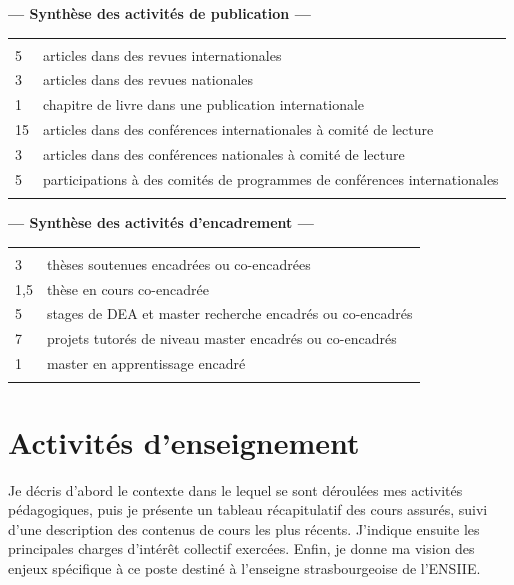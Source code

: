 \documentclass[11pt]{article}
\begin{document}
\begin{center}
	\textbf{--- Synthèse des activités de publication ---}\\[1mm]
\begin{tabular}{ll}
	\hline\\[-2mm]
	5	&	articles dans des revues internationales\\
	3	&	articles dans des revues nationales\\
	1	&	chapitre de livre dans une publication internationale\\
	15	& 	articles dans des conférences internationales à comité de lecture\\
	3	&	articles dans des conférences nationales à comité de lecture\\
	5	& 	participations à des comités de programmes de conférences internationales\\
	\hline\\
\end{tabular}


	\textbf{--- Synthèse des activités d'encadrement ---}\\[1mm]
\begin{tabular}{ll}
	\hline\\[-2mm]
	3	&	thèses soutenues encadrées ou co-encadrées\\
	1,5	& 	thèse en cours co-encadrée\\
	5	&	stages de DEA et master recherche encadrés ou co-encadrés\\
	7	& 	projets tutorés de niveau master encadrés ou co-encadrés\\
	1	& 	master en apprentissage encadré\\
	\hline\\
\end{tabular}

\end{center}



\newpage

\section{Activités d'enseignement}
\label{sc:ensgnt-univ}

Je décris d'abord le contexte dans le lequel se sont déroulées mes activités
pédagogiques, puis je présente un tableau récapitulatif des cours assurés, suivi
d'une description des contenus de cours les plus récents. J'indique ensuite les
principales charges d'intérêt collectif exercées. Enfin, je donne ma vision 
des enjeux spécifique à ce poste destiné à l'enseigne strasbourgeoise de l'ENSIIE.
\end{document}
